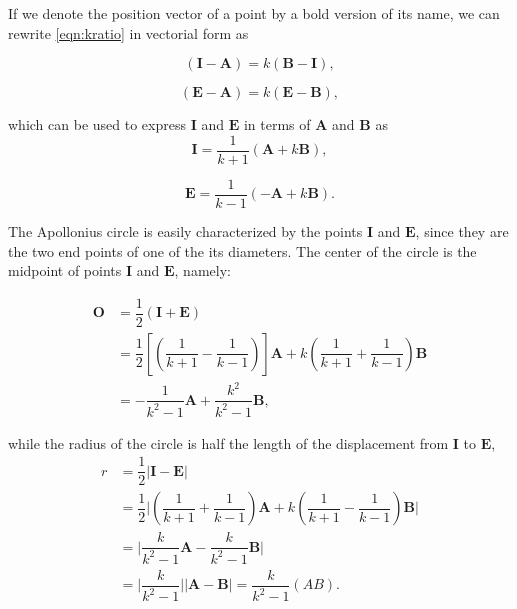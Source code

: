 If we denote the position vector of a point by a bold version of its name, we can rewrite \eqref{eqn:kratio} in vectorial form as

\begin{equation}
(\boldsymbol{I}-\boldsymbol{A})=k(\boldsymbol{B}-\boldsymbol{I}),
\end{equation}

\begin{equation}
(\boldsymbol {E}-\boldsymbol{A})=k(\boldsymbol{E}-\boldsymbol{B}),
\end{equation}

which can be used to express $\boldsymbol{I}$ and $\boldsymbol{E}$ in terms of $\boldsymbol{A}$ and $\boldsymbol{B}$ as 
\begin{equation}
\boldsymbol{I} = \dfrac{1}{k+1} (\boldsymbol{A}+k\boldsymbol{B}),
\label{eqn:ipoint}
\end{equation}

\begin{equation}
\boldsymbol{E} = \dfrac{1}{k-1} (-\boldsymbol{A}+k\boldsymbol{B}).
\label{eqn:epoint}
\end{equation}

The Apollonius circle is easily characterized by the points $\boldsymbol{I}$ and $\boldsymbol{E}$, since they are the two end points of one of the its diameters. The center of the circle is the midpoint of points $\boldsymbol{I}$ and $\boldsymbol{E}$, namely:

\begin{equation}
\begin{split}
\boldsymbol{O} & = \dfrac{1}{2} (\boldsymbol{I}+\boldsymbol{E})\\
& = \dfrac{1}{2} [(\dfrac{1}{k+1}-\dfrac{1}{k-1})]\boldsymbol{A}+k(\dfrac{1}{k+1}+\dfrac{1}{k-1}) \boldsymbol{B}\\
& =-\dfrac{1}{k^{2}-1}\boldsymbol{A} + \dfrac{{k^{2}}}{k^{2}-1} \boldsymbol{B},
\end{split}
\label{eqn:center}
\end{equation}

while the radius of the circle is half the length of the displacement from $\boldsymbol{I}$ to $\boldsymbol{E}$,
\begin{equation}
\begin{split}
r & =\dfrac{1}{2} \lvert \boldsymbol{I} -\boldsymbol{E}\rvert \\
& = \dfrac{1}{2} \lvert (\dfrac{1}{k+1}+\dfrac{1}{k-1})\boldsymbol{A}+k(\dfrac{1}{k+1}-\dfrac{1}{k-1}) \boldsymbol{B}\rvert \\
& =  \lvert\dfrac{k}{k^{2}-1}\boldsymbol{A} - \dfrac{k}{k^{2}-1} \boldsymbol{B}\rvert\\
& = \lvert\dfrac{k}{k^{2}-1}\rvert \lvert\boldsymbol{A} -\boldsymbol{B}\rvert = \dfrac{k}{k^{2}-1}(AB).
\end{split}
\label{eqn:radius}
\end{equation}

